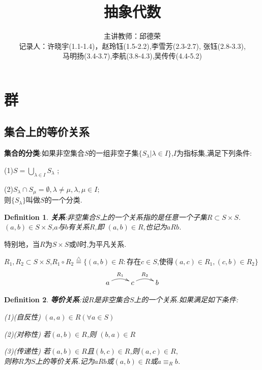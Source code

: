 \documentclass[UTF8]{article}
\title{\textbf{\huge{抽象代数}}}
\author{主讲教师：邱德荣 \\记录人：许晓宇(1.1-1.4)，赵玲钰(1.5-2.2),李雪芳(2.3-2.7),
	张钰(2.8-3.3),\\马明扬(3.4-3.7),李航(3.8-4.3),吴传传(4.4-5.2)}
\date{}
\newtheorem{defn}{Definition}[section]
\begin{document}
\maketitle
\newpage
\tableofcontents
\newpage

\normalsize

\section{群}
\subsection{集合上的等价关系}
\textbf{集合的分类}:如果非空集合$S$的一组非空子集$\{S_\lambda|\lambda\in{I}\}$,$I$为指标集,满足下列条件:

(1)$S=\bigcup_{\lambda\in I}S_\lambda$ ;

(2)${S_\lambda}\cap{S_\mu}=\emptyset,\lambda\ne\mu,\lambda,\mu\in{I};$\\则$\{S_\lambda\}$叫做$S$的一个分类.

\begin{defn}
	\textbf{关系}:非空集合$S$上的一个关系指的是任意一个子集$R\subset S\times S$.$(a,b)\in S\times S$,$a$与$b$有关系$R$,即
	$(a,b)\in R$,也记为$aRb$.
\end{defn}
特别地，当$R$为$S\times S$或$\emptyset $时,为平凡关系.

$R_1,R_2\subset S\times S$,$R_1\circ R_2\stackrel{\bigtriangleup}{=}\{(a,b)\in R:$存在$c\in S$,使得$(a,c)\in R_1,(c,b)\in R_2\}$
\begin{displaymath}
\xymatrix{
	a\ar@/^/[r]^{R_1}
	&
	c\ar@/^/[r]^{R_2}&b
}
\end{displaymath}

\begin{defn}
	\textbf{等价关系}:设$R$是非空集合$S$上的一个关系.如果满足如下条件:
	
	(1)(自反性) $(a,a)\in R(\forall a\in S)$
	
	(2)(对称性) 若$(a,b)\in R$,则 $(b,a)\in R$
	
	(3)(传递性) 若$(a,b)\in R$且$(b,c)\in R$,则$(a,c)\in R,$\\则称$R$为$S$上的等价关系.记为$aRb$或$(a,b)\in R$或$a\equiv_R{b}$.
\end{defn}
\end{document}
